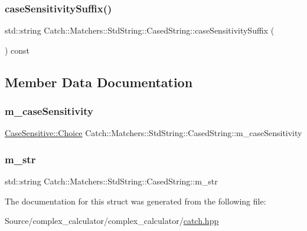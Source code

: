 \subsubsection{\texorpdfstring{case\+Sensitivity\+Suffix()}{caseSensitivitySuffix()}}
{\footnotesize\ttfamily std\+::string Catch\+::\+Matchers\+::\+Std\+String\+::\+Cased\+String\+::case\+Sensitivity\+Suffix (\begin{DoxyParamCaption}{ }\end{DoxyParamCaption}) const}



\subsection{Member Data Documentation}
\mbox{\label{struct_catch_1_1_matchers_1_1_std_string_1_1_cased_string_ae1c2864c986941536a6e94cca0528f92}} 
\subsubsection{\texorpdfstring{m\+\_\+case\+Sensitivity}{m\_caseSensitivity}}
{\footnotesize\ttfamily \mbox{\hyperlink{struct_catch_1_1_case_sensitive_aad49d3aee2d97066642fffa919685c6a}{Case\+Sensitive\+::\+Choice}} Catch\+::\+Matchers\+::\+Std\+String\+::\+Cased\+String\+::m\+\_\+case\+Sensitivity}

\mbox{\label{struct_catch_1_1_matchers_1_1_std_string_1_1_cased_string_ad05dbc99aba3c3c386d6b856b213f911}} 
\subsubsection{\texorpdfstring{m\+\_\+str}{m\_str}}
{\footnotesize\ttfamily std\+::string Catch\+::\+Matchers\+::\+Std\+String\+::\+Cased\+String\+::m\+\_\+str}



The documentation for this struct was generated from the following file\+:\begin{DoxyCompactItemize}
\item 
Source/complex\+\_\+calculator/complex\+\_\+calculator/\mbox{\hyperlink{catch_8hpp}{catch.\+hpp}}\end{DoxyCompactItemize}
